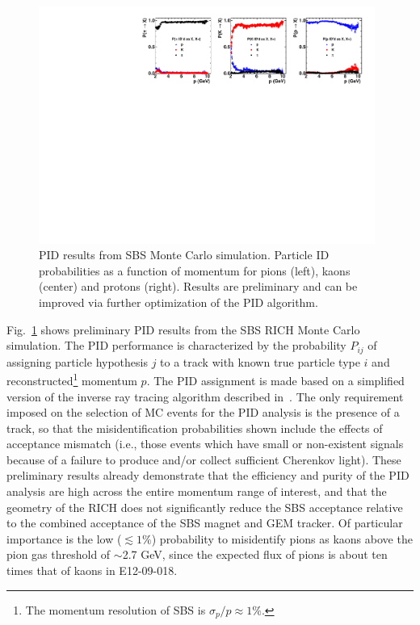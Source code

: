 \begin{figure}[h]
  \begin{center}
    \includegraphics[width=0.98\textwidth]{figures/SBS_PIDfig.pdf}
  \end{center}
  \caption{\label{RICHfig2} PID results from SBS Monte Carlo simulation. Particle ID probabilities as a function of momentum for pions (left), kaons (center) and protons (right). Results are preliminary and can be improved via further optimization of the PID algorithm.}
\end{figure}
Fig.~\ref{RICHfig2} shows preliminary PID results from the SBS RICH Monte Carlo simulation. The PID performance is characterized by the probability $P_{ij}$ of assigning particle hypothesis $j$ to a track with known true particle type $i$ and reconstructed\footnote{The momentum resolution of SBS is $\sigma_p/p \approx 1\%$.} momentum $p$. The PID assignment is made based on a simplified version of the inverse ray tracing algorithm described in~\cite{HERMES_RICH_long_NIM}. The only requirement imposed on the selection of MC events for the PID analysis is the presence of a track, so that the misidentification probabilities shown include the effects of acceptance mismatch (i.e., those events which have small or non-existent signals because of a failure to produce and/or collect sufficient Cherenkov light). These preliminary results already demonstrate that the efficiency and purity of the PID analysis are high across the entire momentum range of interest, and that the geometry of the RICH does not significantly reduce the SBS acceptance relative to the combined acceptance of the SBS magnet and GEM tracker. Of particular importance is the low ($\lesssim 1\%$) probability to misidentify pions as kaons above the pion gas threshold of $\sim$2.7 GeV, since the expected flux of pions is about ten times that of kaons in E12-09-018.

